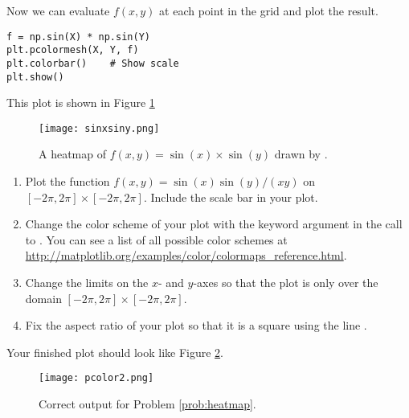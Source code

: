 Now we can evaluate $f(x,y)$ at each point in the grid and plot the result.
\begin{lstlisting}
f = np.sin(X) * np.sin(Y)
plt.pcolormesh(X, Y, f)
plt.colorbar()    # Show scale
plt.show()
\end{lstlisting}
This plot is shown in Figure \ref{fig:pcmexample}
\begin{figure}
\texttt{[image: sinxsiny.png]}
\caption{A heatmap of $f(x,y)=\sin\left(x\right)\times\sin\left(y\right)$ drawn by .}
\label{fig:pcmexample}
\end{figure}

\begin{comment}
\begin{problem} Use plt.pcolormesh to plot the absolute value of the function $x^3 +2x^2 -x +3$ on the complex plane with 0 $\leq$ \li{x} $\leq$ 2 and 0 $\leq$ \li{y} $\leq$ 2.
\emph{Helpful Hint}: First create your domain arrays, then convert these to a single array of complex variables to evaluate the function.

Your plot should look like Figure \ref{fig:pcolormesh}.

\begin{figure}[H]
\texttt{[image: pcolor2.png]}
\caption{Another example of a colorplot.}
\label{fig:pcolormesh}
\end{figure}
\end{problem}
\end{comment}

\begin{problem}\label{prob:heatmap}
\leavevmode
\begin{enumerate}
\item Plot the function $f(x,y) = \sin(x)\sin(y)/(xy)$ on $[-2\pi,2\pi] \times [-2\pi,2\pi]$. 
Include the scale bar in your plot.
\item Change the color scheme of your plot with the keyword argument  in the call to . 
You can see a list of all possible color schemes at \url{http://matplotlib.org/examples/color/colormaps_reference.html}.
\item Change the limits on the $x$- and $y$-axes so that the plot is only over the domain $[-2\pi,2\pi] \times [-2\pi,2\pi]$.
\item Fix the aspect ratio of your plot so that it is a square using the line .
\end{enumerate}
Your finished plot should look like Figure \ref{fig:heatmapProb}.

\begin{figure}[H]
\texttt{[image: pcolor2.png]}
\caption{Correct output for Problem \ref{prob:heatmap}.}
\label{fig:heatmapProb}
\end{figure}
\end{problem}

